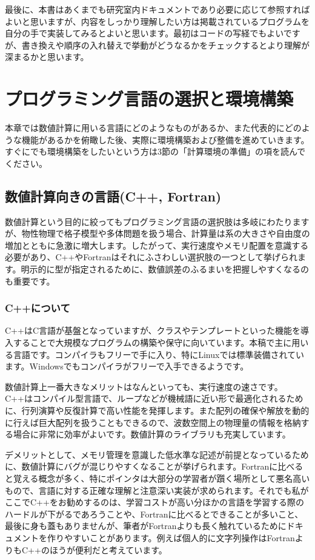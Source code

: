 \documentclass[12pt]{jreport}
\begin{document}
最後に、本書はあくまでも研究室内ドキュメントであり必要に応じて参照すればよいと思いますが、内容をしっかり理解したい方は掲載されているプログラムを自分の手で実装してみるとよいと思います。最初はコードの写経でもよいですが、書き換えや順序の入れ替えで挙動がどうなるかをチェックするとより理解が深まるかと思います。

\tableofcontents

\newpage

\chapter{プログラミング言語の選択と環境構築}
本章では数値計算に用いる言語にどのようなものがあるか、また代表的にどのような機能があるかを俯瞰した後、実際に環境構築および整備を進めていきます。すぐにでも環境構築をしたいという方は3節の「計算環境の準備」の項を読んでください。

\section{数値計算向きの言語(C++, Fortran)}
数値計算という目的に絞ってもプログラミング言語の選択肢は多岐にわたりますが、物性物理で格子模型や多体問題を扱う場合、計算量は系の大きさや自由度の増加とともに急激に増大します。したがって、実行速度やメモリ配置を意識する必要があり、C++やFortranはそれにふさわしい選択肢の一つとして挙げられます。明示的に型が指定されるために、数値誤差のふるまいを把握しやすくなるのも重要です。

\subsection{C++について}
C++はC言語が基盤となっていますが、クラスやテンプレートといった機能を導入することで大規模なプログラムの構築や保守に向いています。本稿で主に用いる言語です。コンパイラもフリーで手に入り、特にLinuxでは標準装備されています。Windowsでもコンパイラがフリーで入手できるようです。

数値計算上一番大きなメリットはなんといっても、実行速度の速さです。C++はコンパイル型言語で、ループなどが機械語に近い形で最適化されるために、行列演算や反復計算で高い性能を発揮します。また配列の確保や解放を動的に行えば巨大配列を扱うこともできるので、波数空間上の物理量の情報を格納する場合に非常に効率がよいです。数値計算のライブラリも充実しています。

デメリットとして、メモリ管理を意識した低水準な記述が前提となっているために、数値計算にバグが混じりやすくなることが挙げられます。Fortranに比べると覚える概念が多く、特にポインタは大部分の学習者が躓く場所として悪名高いもので、言語に対する正確な理解と注意深い実装が求められます。それでも私がここでC++をお勧めするのは、学習コストが高い分ほかの言語を学習する際のハードルが下がるであろうことや、Fortranに比べるとできることが多いこと、最後に身も蓋もありませんが、筆者がFortranよりも長く触れているためにドキュメントを作りやすいことがあります。例えば個人的に文字列操作はFortranよりもC++のほうが便利だと考えています。
\end{document}
